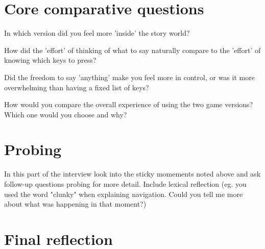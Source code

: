 \section{Core comparative questions}

\begin{QandA}
   \item In which version did you feel more 'inside' the story world?
         \begin{answered}
         
         \end{answered}

   \item How did the 'effort' of thinking of what to say naturally compare to the 'effort' of knowing which keys to press?

         \begin{answered}
         
         \end{answered}

    \item Did the freedom to say 'anything' make you feel more in control, or was it more overwhelming than having a fixed list of keys?

         \begin{answered}
         
         \end{answered}
    \item How would you compare the overall experience of using the two game versions? Which one would you choose and why?

         \begin{answered}
         
         \end{answered}
\end{QandA}






\section{Probing}
In this part of the interview look into the sticky momements noted above and ask follow-up questions probing for more detail.
Include lexical reflection (eg. you used the word "clunky" when explaining navigation. Could you tell me more about what was happening
in that moment?)


\section{Final reflection}

